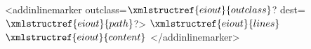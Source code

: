 <addinlinemarker outclass=$\xmlstructref{eiout}{outclass}$? dest=$\xmlstructref{eiout}{path}$?>
  $\xmlstructref{eiout}{lines}$
  $\xmlstructref{eiout}{content}$
</addinlinemarker>
